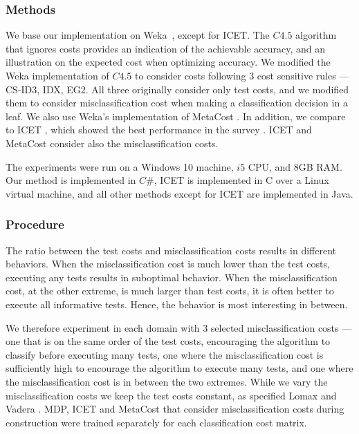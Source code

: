 \documentclass[letterpaper]{article}
\theoremstyle{definition}
\begin{document}
\subsubsection{Methods}

We base our implementation on Weka~\cite{Weka}, except for ICET. The $C4.5$ algorithm that ignores costs provides an indication of the achievable accuracy, and an illustration on the expected cost when optimizing accuracy. We modified the Weka implementation of $C4.5$ to consider costs following 3 cost sensitive rules --- CS-ID3, IDX, EG2. All three originally consider only test costs, and we modified them to consider misclassification cost when making a classification decision in a leaf. We also use Weka's implementation of MetaCost \cite{domingos1999metacost}. In addition, we compare to ICET \cite{turney1995cost}, which showed the best performance in the survey \cite{LomaxV11}. ICET and MetaCost consider also the misclassification costs.

The experiments were run on a Windows 10 machine, $i5$ CPU, and 8GB RAM. Our method is implemented in $C\#$, ICET is implemented in C over a Linux virtual machine, and all other methods except for ICET are implemented in Java.


\subsubsection{Procedure}

The ratio between the test costs and misclassification costs results in different behaviors. When the misclassification cost is much lower than the test costs, executing any tests results in suboptimal behavior. When the misclassification cost, at the other extreme, is much larger than test costs, it is often better to execute all informative tests. Hence, the behavior is most interesting in between.

We therefore experiment in each domain with 3 selected misclassification costs --- one that is on the same order of the test costs, encouraging the algorithm to classify before executing many tests, one where the misclassification cost is sufficiently high to encourage the algorithm to execute many tests, and one where the misclassification cost is in between the two extremes. While we vary the misclassification costs we keep the test costs constant, as specified  Lomax and Vadera . MDP, ICET and MetaCost that consider misclassification costs during construction were trained separately for each classification cost matrix.
\end{document}
